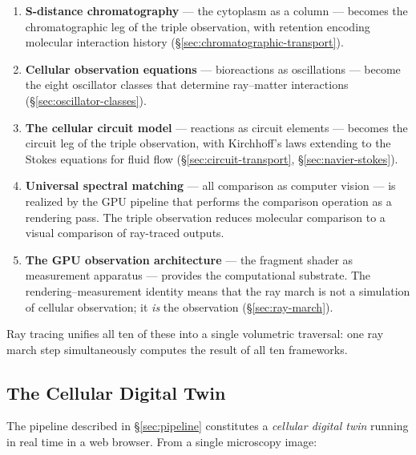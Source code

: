 \documentclass[11pt,twocolumn,a4paper]{article}
\begin{document}
\begin{enumerate}[leftmargin=*,itemsep=2pt]
\item \textbf{S-distance chromatography} --- the cytoplasm as a
  column --- becomes the chromatographic leg of the triple observation,
  with retention encoding molecular interaction history
  (\S\ref{sec:chromatographic-transport}).

\item \textbf{Cellular observation equations} --- bioreactions as
  oscillations --- become the eight oscillator classes that determine
  ray--matter interactions
  (\S\ref{sec:oscillator-classes}).

\item \textbf{The cellular circuit model} --- reactions as circuit
  elements --- becomes the circuit leg of the triple observation,
  with Kirchhoff's laws extending to the Stokes equations for fluid
  flow (\S\ref{sec:circuit-transport}, \S\ref{sec:navier-stokes}).

\item \textbf{Universal spectral matching} --- all comparison as
  computer vision --- is realized by the GPU pipeline that performs
  the comparison operation as a rendering pass. The triple observation
  reduces molecular comparison to a visual comparison of ray-traced
  outputs.

\item \textbf{The GPU observation architecture} --- the fragment
  shader as measurement apparatus --- provides the computational
  substrate. The rendering--measurement identity means that the ray
  march is not a simulation of cellular observation; it \emph{is}
  the observation (\S\ref{sec:ray-march}).
\end{enumerate}

Ray tracing unifies all ten of these into a single volumetric
traversal: one ray march step simultaneously computes the result of
all ten frameworks.

\subsection{The Cellular Digital Twin}

The pipeline described in \S\ref{sec:pipeline} constitutes a
\emph{cellular digital twin} running in real time in a web browser.
From a single microscopy image:
\end{document}
